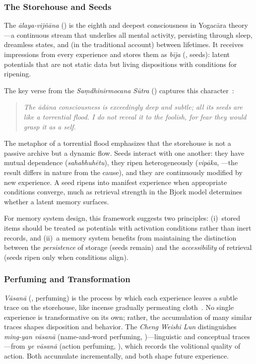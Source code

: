 \subsubsection{The Storehouse and Seeds}

The \emph{\=alaya-vij\~n\=ana} () is the eighth and
deepest consciousness in Yogac\=ara theory---a continuous stream that
underlies all mental activity, persisting through sleep, dreamless
states, and (in the traditional account) between lifetimes. It receives
impressions from every experience and stores them as
\emph{b\=ija} (, seeds): latent potentials that are not
static data but living dispositions with conditions for ripening.

The key verse from the \emph{Sa\d{m}dhinirmocana S\=utra}
() captures this character~\cite{samdhinirmocana}:

\begin{quote}

\medskip
\emph{The \=ad\=ana consciousness is exceedingly deep and subtle; all
its seeds are like a torrential flood. I do not reveal it to the
foolish, for fear they would grasp it as a self.}
\end{quote}

The metaphor of a torrential flood emphasizes that the storehouse is not
a passive archive but a dynamic flow. Seeds interact with one another:
they have mutual dependence (\emph{sahabhuh\=etu}), they ripen
heterogeneously (\emph{vip\=aka}, ---the result differs in
nature from the cause), and they are continuously modified by new
experience. A seed ripens into manifest experience when appropriate
conditions converge, much as retrieval strength in the Bjork model
determines whether a latent memory surfaces.

For memory system design, this framework suggests two principles:
(i)~stored items should be treated as potentials with activation
conditions rather than inert records, and (ii)~a memory system benefits
from maintaining the distinction between the \emph{persistence} of
storage (seeds remain) and the \emph{accessibility} of retrieval (seeds
ripen only when conditions align).

\subsubsection{Perfuming and Transformation}

\emph{V\=asan\=a} (, perfuming) is the process by which each
experience leaves a subtle trace on the storehouse, like incense
gradually permeating cloth~\cite{chengweishilun}. No single experience
is transformative on its own; rather, the accumulation of many similar
traces shapes disposition and behavior. The \emph{Cheng Weishi Lun}
distinguishes \emph{ming-yan v\=asan\=a} (name-and-word perfuming,
)---linguistic and conceptual traces---from
\emph{ye v\=asan\=a} (action perfuming, ), which records
the volitional quality of action. Both accumulate incrementally, and
both shape future experience.

